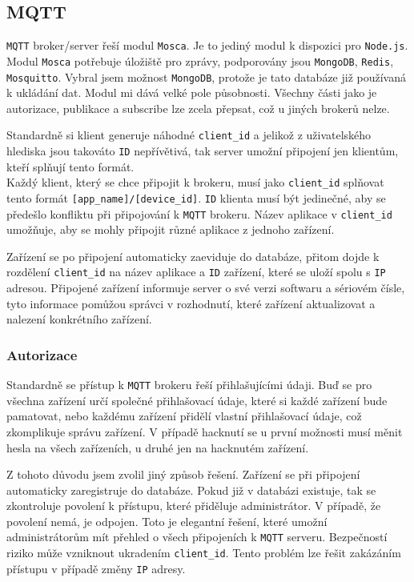 \documentclass[czech,BP]{thesiskiv}
\begin{document}
		\subsection{MQTT}
			\texttt{MQTT} broker/server řeší modul \texttt{Mosca}. Je to jediný modul k dispozici pro \texttt{Node.js}. Modul \texttt{Mosca} potřebuje úložiště pro zprávy, podporovány jsou \texttt{MongoDB}, \texttt{Redis}, \texttt{Mosquitto}. Vybral jsem možnost \texttt{MongoDB}, protože je tato databáze již používaná k ukládání dat. Modul mi dává velké pole působnosti. Všechny části jako je autorizace, publikace a subscribe lze zcela přepsat, což u jiných brokerů nelze.
			
			Standardně si klient generuje náhodné \texttt{client\_id} a jelikož z uživatelského hlediska jsou takováto \texttt{ID} nepřívětivá, tak server umožní připojení jen klientům, kteří splňují tento formát.\\Každý klient, který se chce připojit k brokeru, musí jako \texttt{client\_id} splňovat tento formát \texttt{[app\_name]/[device\_id]}. \texttt{ID} klienta musí být jedinečné, aby se předešlo konfliktu při připojování k \texttt{MQTT} brokeru. 
				Název aplikace v \texttt{client\_id} umožňuje, aby se mohly připojit různé aplikace z jednoho zařízení. 

			Zařízení se po připojení automaticky zaeviduje do databáze, přitom dojde k rozdělení \texttt{client\_id} na název aplikace a \texttt{ID} zařízení, které se uloží spolu s \texttt{IP} adresou. 
			Připojené zařízení informuje server o své verzi softwaru a sériovém čísle, tyto informace pomůžou správci v rozhodnutí, které zařízení aktualizovat a nalezení konkrétního zařízení. 
			
			
\newpage	
			\subsubsection{Autorizace}
		Standardně se přístup k \texttt{MQTT} brokeru řeší přihlašujícími údaji. 
		Buď se pro všechna zařízení určí společné přihlašovací údaje, které si každé zařízení bude pamatovat, nebo každému zařízení přidělí vlastní přihlašovací údaje, což zkomplikuje správu zařízení.		
 		V případě hacknutí se u první možnosti musí měnit hesla na všech zařízeních, u druhé jen na hacknutém zařízení.
 		
 		Z tohoto důvodu jsem zvolil jiný způsob řešení.
		Zařízení se při připojení automaticky zaregistruje do databáze. Pokud již v databázi existuje, tak se zkontroluje povolení k přístupu, které přiděluje administrátor.
		V případě, že povolení nemá, je odpojen. Toto je elegantní řešení, které umožní administrátorům mít přehled o všech připojeních k \texttt{MQTT} serveru.			
		Bezpečností riziko může vzniknout ukradením \texttt{client\_id}. Tento problém lze řešit zakázáním přístupu v případě změny \texttt{IP} adresy.
		
\end{document}
